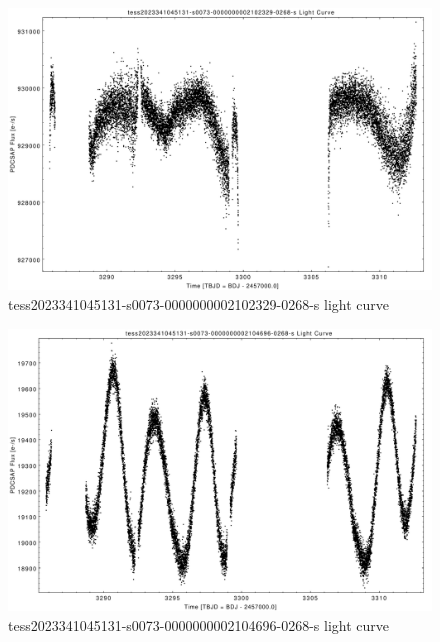 \documentclass[a4paper,12pt]{article}
\begin{document}
\begin{figure}[htbp]
    \centering
    \includegraphics[width = 1\textwidth]{
      ../lightcurves/tess2023341045131-s0073-0000000002102329-0268-s.pdf}
    \caption{tess2023341045131-s0073-0000000002102329-0268-s light curve}
\end{figure}
\begin{figure}[htbp]
    \centering
    \includegraphics[width = 1\textwidth]{
      ../lightcurves/tess2023341045131-s0073-0000000002104696-0268-s.pdf}
    \caption{tess2023341045131-s0073-0000000002104696-0268-s light curve}
\end{figure}
\end{document}
